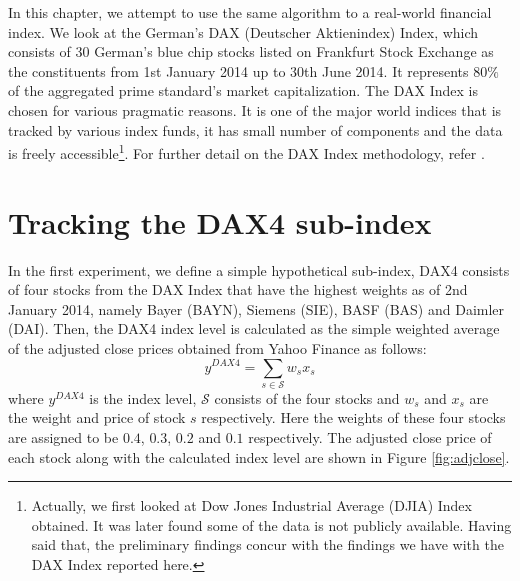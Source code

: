 
In this chapter, we attempt to use the same algorithm to a real-world financial index. We look at the German's DAX (Deutscher Aktienindex) Index, which consists of 30 German's blue chip stocks listed on Frankfurt Stock Exchange as the constituents from 1st January 2014 up to 30th June 2014. It represents $80\%$ of the aggregated prime standard's market capitalization. The DAX Index is chosen for various pragmatic reasons. It is one of the major world indices that is tracked by various index funds, it has small number of components and the data is freely accessible\footnote{Actually, we first looked at Dow Jones Industrial Average (DJIA) Index obtained. It was later found some of the data is not publicly available. Having said that, the preliminary findings concur with the findings we have with the DAX Index reported here.}. For further detail on the DAX Index methodology, refer \cite{DAX14}.
 
\section{Tracking the DAX4 sub-index}
In the first experiment, we define a simple hypothetical sub-index, DAX4 consists of four stocks from the DAX Index that have the highest weights as of 2nd January 2014, namely Bayer (BAYN), Siemens (SIE), BASF (BAS) and Daimler (DAI). Then, the DAX4 index level is calculated as the simple weighted average of the adjusted close prices obtained from Yahoo Finance as follows:
\begin{equation}
  y^{DAX4} = \sum_{s \in \mathcal{S}} w_s x_s
\end{equation}
where $y^{DAX4}$ is the index level, $\mathcal{S}$ consists of the four stocks and  $w_s$ and $x_s$ are the weight and price of stock $s$ respectively. Here the weights of these four stocks are assigned to be $0.4$, $0.3$, $0.2$ and $0.1$ respectively. The adjusted close price of each stock along with the calculated index level are shown in Figure \ref{fig:adjclose}.
 
